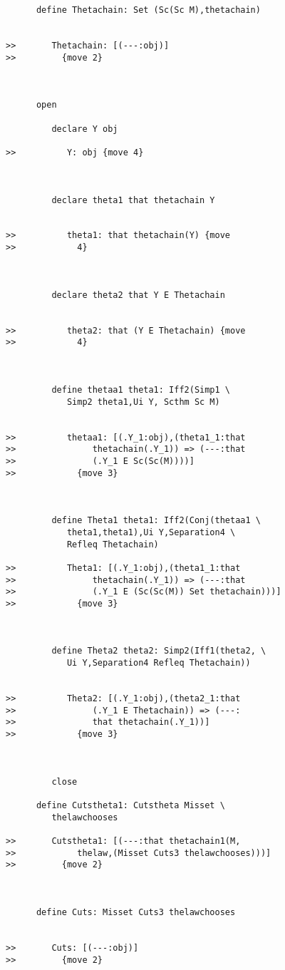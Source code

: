 \documentclass[12pt]{article}
\begin{document}
\begin{verbatim}
      define Thetachain: Set (Sc(Sc M),thetachain)


>>       Thetachain: [(---:obj)]
>>         {move 2}



      open

         declare Y obj

>>          Y: obj {move 4}



         declare theta1 that thetachain Y


>>          theta1: that thetachain(Y) {move
>>            4}



         declare theta2 that Y E Thetachain


>>          theta2: that (Y E Thetachain) {move
>>            4}



         define thetaa1 theta1: Iff2(Simp1 \
            Simp2 theta1,Ui Y, Scthm Sc M)


>>          thetaa1: [(.Y_1:obj),(theta1_1:that
>>               thetachain(.Y_1)) => (---:that
>>               (.Y_1 E Sc(Sc(M))))]
>>            {move 3}



         define Theta1 theta1: Iff2(Conj(thetaa1 \
            theta1,theta1),Ui Y,Separation4 \
            Refleq Thetachain)

>>          Theta1: [(.Y_1:obj),(theta1_1:that
>>               thetachain(.Y_1)) => (---:that
>>               (.Y_1 E (Sc(Sc(M)) Set thetachain)))]
>>            {move 3}



         define Theta2 theta2: Simp2(Iff1(theta2, \
            Ui Y,Separation4 Refleq Thetachain))


>>          Theta2: [(.Y_1:obj),(theta2_1:that
>>               (.Y_1 E Thetachain)) => (---:
>>               that thetachain(.Y_1))]
>>            {move 3}



         close

      define Cutstheta1: Cutstheta Misset \
         thelawchooses

>>       Cutstheta1: [(---:that thetachain1(M,
>>            thelaw,(Misset Cuts3 thelawchooses)))]
>>         {move 2}



      define Cuts: Misset Cuts3 thelawchooses


>>       Cuts: [(---:obj)]
>>         {move 2}




\end{verbatim}
\end{document}
